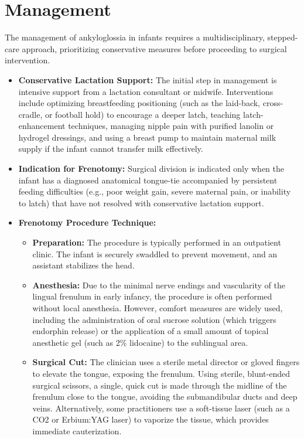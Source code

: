 \section*{Management}
The management of ankyloglossia in infants requires a multidisciplinary, stepped-care approach, prioritizing conservative measures before proceeding to surgical intervention.
\begin{itemize}
  \item \textbf{Conservative Lactation Support:} The initial step in management is intensive support from a lactation consultant or midwife. Interventions include optimizing breastfeeding positioning (such as the laid-back, cross-cradle, or football hold) to encourage a deeper latch, teaching latch-enhancement techniques, managing nipple pain with purified lanolin or hydrogel dressings, and using a breast pump to maintain maternal milk supply if the infant cannot transfer milk effectively.
  \item \textbf{Indication for Frenotomy:} Surgical division is indicated only when the infant has a diagnosed anatomical tongue-tie accompanied by persistent feeding difficulties (e.g., poor weight gain, severe maternal pain, or inability to latch) that have not resolved with conservative lactation support.
  \item \textbf{Frenotomy Procedure Technique:}
    \begin{itemize}
      \item \textbf{Preparation:} The procedure is typically performed in an outpatient clinic. The infant is securely swaddled to prevent movement, and an assistant stabilizes the head.
      \item \textbf{Anesthesia:} Due to the minimal nerve endings and vascularity of the lingual frenulum in early infancy, the procedure is often performed without local anesthesia. However, comfort measures are widely used, including the administration of oral sucrose solution (which triggers endorphin release) or the application of a small amount of topical anesthetic gel (such as 2\% lidocaine) to the sublingual area.
      \item \textbf{Surgical Cut:} The clinician uses a sterile metal director or gloved fingers to elevate the tongue, exposing the frenulum. Using sterile, blunt-ended surgical scissors, a single, quick cut is made through the midline of the frenulum close to the tongue, avoiding the submandibular ducts and deep veins. Alternatively, some practitioners use a soft-tissue laser (such as a CO2 or Erbium:YAG laser) to vaporize the tissue, which provides immediate cauterization.

\end{itemize}
\end{itemize}
